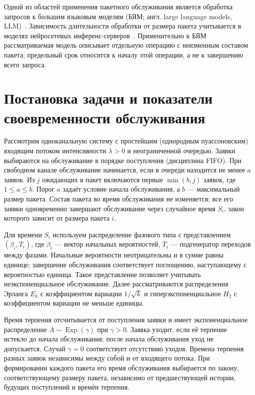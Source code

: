 Одной из областей применения пакетного обслуживания является обработка запросов к большим языковым моделям (БЯМ; англ. large language models, LLM)~\cite{yu2022orca}. Зависимость длительности обработки от размера пакета учитывается в моделях нейросетевых инференс-серверов~\cite{inoue2021}. Применительно к БЯМ рассматриваемая модель описывает отдельную операцию с неизменным составом пакета; предельный срок относится к началу этой операции, а не к завершению всего запроса.

\section*{Постановка задачи и показатели своевременности обслуживания}

Рассмотрим одноканальную систему с простейшим (однородным пуассоновским) входящим потоком интенсивности $\lambda>0$ и неограниченной очередью. Заявки выбираются на обслуживание в порядке поступления (дисциплина FIFO). При свободном канале обслуживание начинается, если в очереди находится не менее $a$ заявок. Из $j$ ожидающих в пакет включаются первые $\min(b,j)$ заявок, где $1\leq a\leq b$. Порог $a$ задаёт условие начала обслуживания, а $b$ --- максимальный размер пакета. Состав пакета во время обслуживания не изменяется; все его заявки одновременно завершают обслуживание через случайное время $S_i$, закон которого зависит от размера пакета $i$.

Для времени $S_i$ используем распределение фазового типа с представлением $(\beta_i,T_i)$, где $\beta_i$ --- вектор начальных вероятностей, $T_i$ --- подгенератор переходов между фазами. Начальные вероятности неотрицательны и в сумме равны единице; завершение обслуживания соответствует поглощению, наступающему с вероятностью единица. Такое представление позволяет учитывать неэкспоненциальное обслуживание. Далее рассматриваются распределения Эрланга $E_k$ с коэффициентом вариации $1/\sqrt{k}$ и гиперэкспоненциальное $H_2$ с коэффициентом вариации не меньше единицы.

Время терпения отсчитывается от поступления заявки и имеет экспоненциальное распределение $A\sim\operatorname{Exp}(\gamma)$ при $\gamma>0$. Заявка уходит, если её терпение истекло до начала обслуживания; после начала обслуживания уход не допускается. Случай $\gamma=0$ соответствует отсутствию уходов. Времена терпения разных заявок независимы между собой и от входящего потока. При формировании каждого пакета его время обслуживания выбирается по закону, соответствующему размеру пакета, независимо от предшествующей истории, будущих поступлений и времён терпения.


